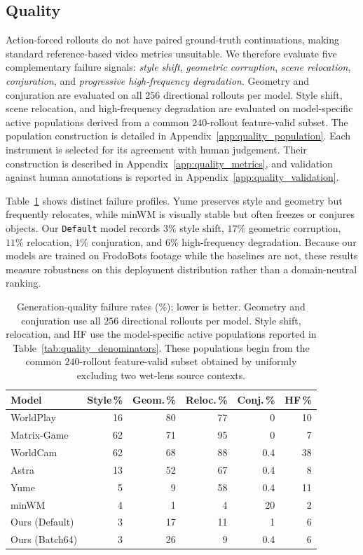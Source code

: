 \documentclass[letterpaper]{article} %
\begin{document}
\subsection{Quality}

Action-forced rollouts do not have paired ground-truth continuations, making
standard reference-based video metrics unsuitable. We therefore evaluate five
complementary failure signals: \emph{style shift}, \emph{geometric corruption},
\emph{scene relocation}, \emph{conjuration}, and \emph{progressive
high-frequency degradation}. Geometry and conjuration are evaluated on all $256$ directional rollouts per
model. Style shift, scene relocation, and high-frequency degradation are
evaluated on model-specific active populations derived from a common
$240$-rollout feature-valid subset. The population construction is detailed in
Appendix~\ref{app:quality_population}. Each instrument is selected for its agreement with human judgement. Their
construction is described in Appendix~\ref{app:quality_metrics}, and validation
against human annotations is reported in
Appendix~\ref{app:quality_validation}.

Table~\ref{tab:quality_all} shows distinct failure profiles. Yume preserves
style and geometry but frequently relocates, while minWM is visually stable
but often freezes or conjures objects. Our \texttt{Default} model records $3\%$ style shift, $17\%$
geometric corruption, $11\%$ relocation, $1\%$ conjuration, and
$6\%$ high-frequency degradation. Because our models are
trained on FrodoBots footage while the baselines are not, these results measure
robustness on this deployment distribution rather than a domain-neutral
ranking.

\begin{table}[t]
\centering
{
\small
\setlength{\tabcolsep}{4pt}
\begin{tabular}{lrrrrr}
\toprule
Model & Style\,\% & Geom.\,\% & Reloc.\,\% & Conj.\,\% & HF\,\% \\
\midrule
WorldPlay      & 16 & 80 & 77 & 0   & 10 \\
Matrix-Game    & 62 & 71 & 95 & 0   & 7  \\
WorldCam       & 62 & 68 & 88 & 0.4 & 38 \\
Astra          & 13 & 52 & 67 & 0.4 & 8  \\
Yume           & 5  & 9  & 58 & 0.4 & 11 \\
minWM          & 4  & 1  & 4  & 20  & 2  \\
Ours (Default) & 3  & 17 & 11 & 1   & 6  \\
Ours (Batch64) & 3  & 26 & 9  & 0.4 & 6  \\
\bottomrule
\end{tabular}
}
\caption{
    Generation-quality failure rates (\%); lower is better. Geometry and
    conjuration use all $256$ directional rollouts per model. Style shift,
    relocation, and HF use the model-specific active populations reported in
    Table~\ref{tab:quality_denominators}. These populations begin from the
    common $240$-rollout feature-valid subset obtained by uniformly excluding
    two wet-lens source contexts.
}
\label{tab:quality_all}
\end{table}
\end{document}
